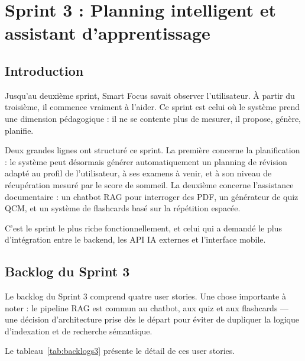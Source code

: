 \chapter{Sprint 3 : Planning intelligent et assistant d'apprentissage}
\label{chap:sprint3}

\section{Introduction}

Jusqu'au deuxième sprint, Smart Focus savait observer l'utilisateur. À partir du troisième, il commence vraiment à l'aider. Ce sprint est celui où le système prend une dimension pédagogique : il ne se contente plus de mesurer, il propose, génère, planifie.

Deux grandes lignes ont structuré ce sprint. La première concerne la planification : le système peut désormais générer automatiquement un planning de révision adapté au profil de l'utilisateur, à ses examens à venir, et à son niveau de récupération mesuré par le score de sommeil. La deuxième concerne l'assistance documentaire : un chatbot RAG pour interroger des PDF, un générateur de quiz QCM, et un système de flashcards basé sur la répétition espacée.

C'est le sprint le plus riche fonctionnellement, et celui qui a demandé le plus d'intégration entre le backend, les API IA externes et l'interface mobile.

\section{Backlog du Sprint 3}

Le backlog du Sprint 3 comprend quatre user stories. Une chose importante à noter : le pipeline RAG est commun au chatbot, aux quiz et aux flashcards — une décision d'architecture prise dès le départ pour éviter de dupliquer la logique d'indexation et de recherche sémantique.

Le tableau~\ref{tab:backlogs3} présente le détail de ces user stories.

